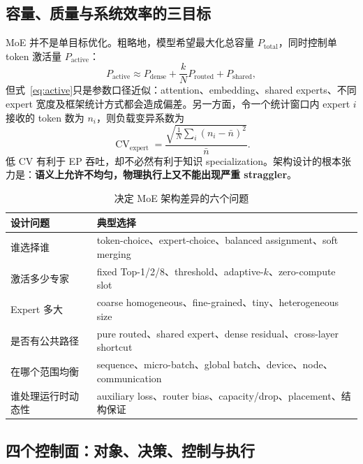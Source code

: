 \documentclass[10pt,a4paper,fontset=none]{ctexart}
\newcommand{\term}[1]{\textbf{#1}}
\begin{document}
\subsection{容量、质量与系统效率的三目标}

MoE 并不是单目标优化。粗略地，模型希望最大化总容量 $P_{\mathrm{total}}$，同时控制单 token 激活量 $P_{\mathrm{active}}$：
\begin{equation}
  P_{\mathrm{active}} \approx P_{\mathrm{dense}}
  +\frac{k}{N}P_{\mathrm{routed}}+P_{\mathrm{shared}},
  \label{eq:active}
\end{equation}
但式~\eqref{eq:active}只是参数口径近似：attention、embedding、shared experts、不同 expert 宽度及框架统计方式都会造成偏差。另一方面，令一个统计窗口内 expert $i$ 接收的 token 数为 $n_i$，则负载变异系数为
\begin{equation}
  \operatorname{CV}_{\mathrm{expert}}
  =\frac{\sqrt{\frac{1}{N}\sum_i(n_i-\bar n)^2}}{\bar n}.
  \label{eq:cv}
\end{equation}
低 CV 有利于 EP 吞吐，却不必然有利于知识 specialization。架构设计的根本张力是：\term{语义上允许不均匀，物理执行上又不能出现严重 straggler}。

\begin{table}[htbp]
\centering
\caption{决定 MoE 架构差异的六个问题}
\label{tab:sixquestions}
\small
\begin{tabularx}{\textwidth}{p{}Y}
\toprule
设计问题 & 典型选择 \\
\midrule
谁选择谁 & token-choice、expert-choice、balanced assignment、soft merging \\
激活多少专家 & fixed Top-1/2/8、threshold、adaptive-$k$、zero-compute slot \\
Expert 多大 & coarse homogeneous、fine-grained、tiny、heterogeneous size \\
是否有公共路径 & pure routed、shared expert、dense residual、cross-layer shortcut \\
在哪个范围均衡 & sequence、micro-batch、global batch、device、node、communication \\
谁处理运行时动态性 & auxiliary loss、router bias、capacity/drop、placement、结构保证 \\
\bottomrule
\end{tabularx}
\end{table}

\subsection{四个控制面：对象、决策、控制与执行}
\end{document}
